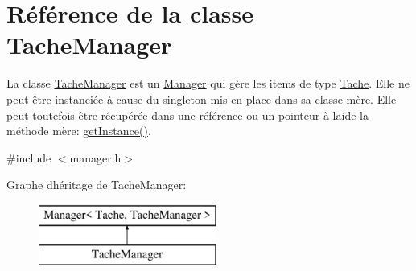 \hypertarget{class_tache_manager}{}\section{Référence de la classe Tache\+Manager}
\label{class_tache_manager}


La classe \hyperlink{class_tache_manager}{Tache\+Manager} est un \hyperlink{class_manager}{Manager} qui gère les items de type \hyperlink{class_tache}{Tache}. Elle ne peut être instanciée à cause du singleton mis en place dans sa classe mère. Elle peut toutefois être récupérée dans une référence ou un pointeur à l\textquotesingle{}aide la méthode mère\+: \hyperlink{class_manager_a8372e4f1e14f3605a57d839b152325ed}{get\+Instance()}.  




{\ttfamily \#include $<$manager.\+h$>$}

Graphe d\textquotesingle{}héritage de Tache\+Manager\+:\begin{figure}[H]
\begin{center}
\leavevmode
\includegraphics[height=2.000000cm]{class_tache_manager}
\end{center}
\end{figure}
